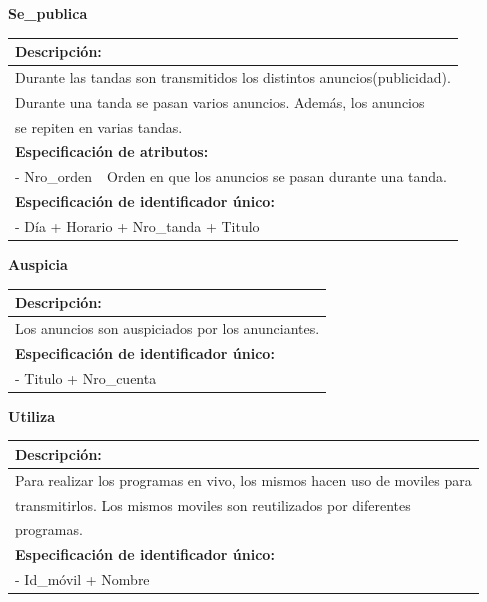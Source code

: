 \documentclass[a4paper,10pt]{article}
\begin{document}
    \begin{flushleft}
      \begin{large} \bf{Se\_publica} \end{large}
    \end{flushleft}
      \begin{tabular}{| p{2cm} | p{9cm} |}
	\hline
	\multicolumn{2}{|l|}{\bf{Descripci\'on:}} \\
	\hline
	\multicolumn{2}{|l|}{Durante las tandas son transmitidos los distintos anuncios(publicidad).} \\
	\multicolumn{2}{|l|}{Durante una tanda se pasan varios anuncios. Adem\'as, los anuncios } \\	
	\multicolumn{2}{|l|}{se repiten en varias tandas.} \\
	\hline
	\multicolumn{2}{|l|}{\bf{Especificaci\'on de atributos:}} \\
	\hline
	- Nro\_orden & Orden en que los anuncios se pasan durante una tanda. \\
	\hline
	\multicolumn{2}{|l|}{\bf{Especificaci\'on de identificador \'unico:}} \\
	\hline
	\multicolumn{2}{|l|}{- D\'ia + Horario + Nro\_tanda + Titulo} \\
	\hline
      \end{tabular}

    \begin{flushleft}
      \begin{large} \bf{Auspicia} \end{large}
    \end{flushleft}
      \begin{tabular}{| p{2cm} | p{9cm} |}
	\hline
	\multicolumn{2}{|l|}{\bf{Descripci\'on:}} \\
	\hline
	\multicolumn{2}{|l|}{Los anuncios son auspiciados por los anunciantes.} \\
	\hline	
	\multicolumn{2}{|l|}{\bf{Especificaci\'on de identificador \'unico:}} \\
	\hline
	\multicolumn{2}{|l|}{- Titulo + Nro\_cuenta} \\
	\hline
      \end{tabular}

    \begin{flushleft}
      \begin{large} \bf{Utiliza} \end{large}
    \end{flushleft}
      \begin{tabular}{| p{2cm} | p{9cm} |}
	\hline
	\multicolumn{2}{|l|}{\bf{Descripci\'on:}} \\
	\hline
	\multicolumn{2}{|l|}{Para realizar los programas en vivo, los mismos hacen uso de moviles para} \\
	\multicolumn{2}{|l|}{transmitirlos. Los mismos moviles son reutilizados por diferentes} \\	
	\multicolumn{2}{|l|}{programas.} \\
	\hline	
	\multicolumn{2}{|l|}{\bf{Especificaci\'on de identificador \'unico:}} \\
	\hline
	\multicolumn{2}{|l|}{- Id\_m\'ovil + Nombre} \\
	\hline
      \end{tabular}
\end{document}
